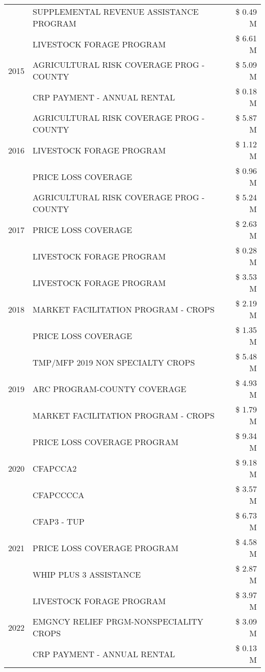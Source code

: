 \begin{tabular}{llr}
 & SUPPLEMENTAL REVENUE ASSISTANCE PROGRAM & \$ 0.49 M \\
\cline{1-3}
\multirow[t]{3}{*}{2015} & LIVESTOCK FORAGE PROGRAM & \$ 6.61 M \\
 & AGRICULTURAL RISK COVERAGE PROG - COUNTY & \$ 5.09 M \\
 & CRP PAYMENT - ANNUAL RENTAL & \$ 0.18 M \\
\cline{1-3}
\multirow[t]{3}{*}{2016} & AGRICULTURAL RISK COVERAGE PROG - COUNTY & \$ 5.87 M \\
 & LIVESTOCK FORAGE PROGRAM & \$ 1.12 M \\
 & PRICE LOSS COVERAGE & \$ 0.96 M \\
\cline{1-3}
\multirow[t]{3}{*}{2017} & AGRICULTURAL RISK COVERAGE PROG - COUNTY & \$ 5.24 M \\
 & PRICE LOSS COVERAGE & \$ 2.63 M \\
 & LIVESTOCK FORAGE PROGRAM & \$ 0.28 M \\
\cline{1-3}
\multirow[t]{3}{*}{2018} & LIVESTOCK FORAGE PROGRAM & \$ 3.53 M \\
 & MARKET FACILITATION PROGRAM - CROPS & \$ 2.19 M \\
 & PRICE LOSS COVERAGE & \$ 1.35 M \\
\cline{1-3}
\multirow[t]{3}{*}{2019} & TMP/MFP 2019 NON SPECIALTY CROPS & \$ 5.48 M \\
 & ARC PROGRAM-COUNTY COVERAGE & \$ 4.93 M \\
 & MARKET FACILITATION PROGRAM - CROPS & \$ 1.79 M \\
\cline{1-3}
\multirow[t]{3}{*}{2020} & PRICE LOSS COVERAGE PROGRAM & \$ 9.34 M \\
 & CFAPCCA2 & \$ 9.18 M \\
 & CFAPCCCCA & \$ 3.57 M \\
\cline{1-3}
\multirow[t]{3}{*}{2021} & CFAP3 - TUP & \$ 6.73 M \\
 & PRICE LOSS COVERAGE PROGRAM & \$ 4.58 M \\
 & WHIP PLUS 3 ASSISTANCE & \$ 2.87 M \\
\cline{1-3}
\multirow[t]{3}{*}{2022} & LIVESTOCK FORAGE PROGRAM & \$ 3.97 M \\
 & EMGNCY RELIEF PRGM-NONSPECIALITY CROPS & \$ 3.09 M \\
 & CRP PAYMENT - ANNUAL RENTAL & \$ 0.13 M \\
\cline{1-3}
\bottomrule
\end{tabular}

